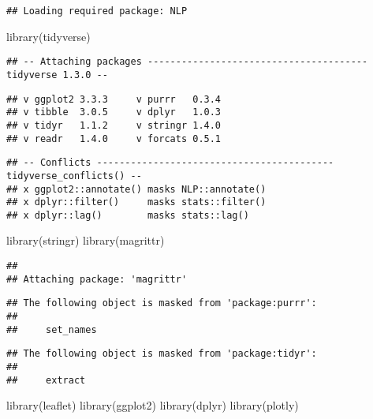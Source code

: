 \documentclass[
]{article}
\newenvironment{Shaded}{\begin{snugshade}}{\end{snugshade}}
\newcommand{\FunctionTok}[1]{\textcolor[rgb]{0.00,0.00,0.00}{#1}}
\newcommand{\NormalTok}[1]{#1}
\begin{document}
\begin{verbatim}
## Loading required package: NLP
\end{verbatim}

\begin{Shaded}
\begin{Highlighting}[]
\FunctionTok{library}\NormalTok{(tidyverse)}
\end{Highlighting}
\end{Shaded}

\begin{verbatim}
## -- Attaching packages --------------------------------------- tidyverse 1.3.0 --
\end{verbatim}

\begin{verbatim}
## v ggplot2 3.3.3     v purrr   0.3.4
## v tibble  3.0.5     v dplyr   1.0.3
## v tidyr   1.1.2     v stringr 1.4.0
## v readr   1.4.0     v forcats 0.5.1
\end{verbatim}

\begin{verbatim}
## -- Conflicts ------------------------------------------ tidyverse_conflicts() --
## x ggplot2::annotate() masks NLP::annotate()
## x dplyr::filter()     masks stats::filter()
## x dplyr::lag()        masks stats::lag()
\end{verbatim}

\begin{Shaded}
\begin{Highlighting}[]
\FunctionTok{library}\NormalTok{(stringr)}
\FunctionTok{library}\NormalTok{(magrittr)}
\end{Highlighting}
\end{Shaded}

\begin{verbatim}
## 
## Attaching package: 'magrittr'
\end{verbatim}

\begin{verbatim}
## The following object is masked from 'package:purrr':
## 
##     set_names
\end{verbatim}

\begin{verbatim}
## The following object is masked from 'package:tidyr':
## 
##     extract
\end{verbatim}

\begin{Shaded}
\begin{Highlighting}[]
\FunctionTok{library}\NormalTok{(leaflet)}
\FunctionTok{library}\NormalTok{(ggplot2)}
\FunctionTok{library}\NormalTok{(dplyr)}
\FunctionTok{library}\NormalTok{(plotly)}
\end{Highlighting}
\end{Shaded}
\end{document}
